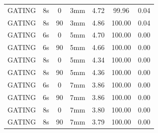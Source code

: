\documentclass[type=dr, dr=rernat, accentcolor=tud7b,colorbacktitle, bigchapter, openright, twoside, 12pt ]{tudthesis}
\begin{document}
\begin{table}[H]
\begin{tabular}{|c||c|c|c||c|c|c|}
GATING & 8s & 0 & 3mm & 4.72 & 99.96 & 0.04 \\
GATING & 8s & 90 & 3mm & 4.86 & 100.00 & 0.04 \\
GATING & 6s & 0 & 5mm & 4.70 & 100.00 & 0.00 \\
GATING & 6s & 90 & 5mm & 4.66 & 100.00 & 0.00 \\
GATING & 8s & 0 & 5mm & 4.34 & 100.00 & 0.00 \\
GATING & 8s & 90 & 5mm & 4.36 & 100.00 & 0.00 \\
GATING & 6s & 0 & 7mm & 3.86 & 100.00 & 0.00 \\
GATING & 6s & 90 & 7mm & 3.86 & 100.00 & 0.00 \\
GATING & 8s & 0 & 7mm & 3.80 & 100.00 & 0.00 \\
GATING & 8s & 90 & 7mm & 3.79 & 100.00 & 0.00 \\
    \hline\hline 
  \end{tabular}
\end{table}

\newpage
\end{document}
